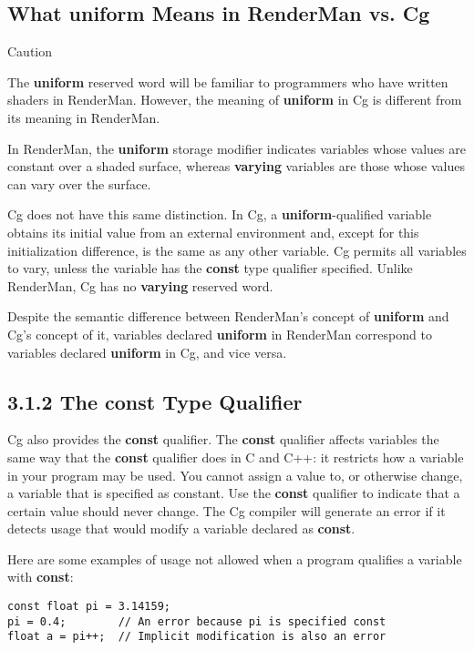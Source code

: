 \documentclass[../main.tex]{subfiles}
\begin{document}
\subsection*{What \textbf{uniform} Means in RenderMan vs. Cg}

\begin{framed}
Caution

The \textbf{uniform} reserved word will be familiar to programmers who have written shaders in RenderMan. However, the meaning of \textbf{uniform} in Cg is different from its meaning in RenderMan.
\end{framed}

In RenderMan, the \textbf{uniform} storage modifier indicates variables whose values are constant over a shaded surface, whereas \textbf{varying} variables are those whose values can vary over the surface.

Cg does not have this same distinction. In Cg, a \textbf{uniform}-qualified variable obtains its initial value from an external environment and, except for this initialization difference, is the same as any other variable. Cg permits all variables to vary, unless the variable has the \textbf{const} type qualifier specified. Unlike RenderMan, Cg has no \textbf{varying} reserved word.

Despite the semantic difference between RenderMan's concept of \textbf{uniform} and Cg's concept of it, variables declared \textbf{uniform} in RenderMan correspond to variables declared \textbf{uniform} in Cg, and vice versa.

\subsection{3.1.2 The \textbf{const} Type Qualifier}

Cg also provides the \textbf{const} qualifier. The \textbf{const} qualifier affects variables the same way that the \textbf{const} qualifier does in C and C++: it restricts how a variable in your program may be used. You cannot assign a value to, or otherwise change, a variable that is specified as constant. Use the \textbf{const} qualifier to indicate that a certain value should never change. The Cg compiler will generate an error if it detects usage that would modify a variable declared as \textbf{const}.

Here are some examples of usage not allowed when a program qualifies a variable with \textbf{const}:

\FloatBarrier
\begin{lstlisting}
const float pi = 3.14159;
pi = 0.4;        // An error because pi is specified const
float a = pi++;  // Implicit modification is also an error
\end{lstlisting}
\FloatBarrier
\end{document}
